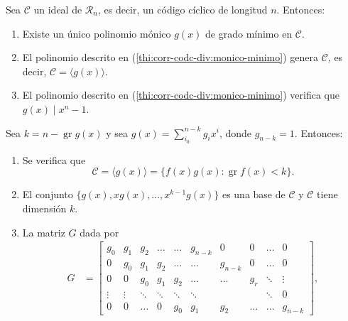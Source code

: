 \begin{theorem}
  \label{th:corr-cod-div}
  Sea \(\mathcal C\) un ideal de \(\mathcal R_n\), es decir, un código cíclico de longitud \(n\). Entonces:
  \begin{enumerate}
    \item Existe un único polinomio mónico \(g(x)\) de grado mínimo en \(\mathcal C\).\label{thi:corr-codc-div:monico-minimo}
    \item El polinomio descrito en (\ref{thi:corr-codc-div:monico-minimo}) genera \(\mathcal C\), es decir, \(\mathcal C = \langle g(x)\rangle\).
    \item El polinomio descrito en (\ref{thi:corr-codc-div:monico-minimo}) verifica que \(g(x) \mid x^n -1\).\label{thi:corr-codc-div:div-xn-1}
  \end{enumerate}
  Sea \(k = n - \operatorname{gr} g(x)\) y sea \(g(x) = \sum_{i_0}^{n-k}g_ix^{i}\), donde \(g_{n-k} = 1\). Entonces:
  \begin{enumerate}[resume]
    \item \label{thi:corr-codc-div:dim-ideal} Se verifica que \[
      \mathcal C = \langle g(x) \rangle = \{f(x)g(x) : \operatorname{gr} f(x) < k\}.
    \]
    \item El conjunto \(\{g(x), xg(x), \dots, x^{k-1}g(x)\}\) es una base de \(\mathcal C\) y \(\mathcal C\) tiene dimensión \(k\).
    \item La matriz \(G\) dada por \begin{align*}
      G &= \begin{bmatrix}
        g_0 & g_1 & g_2 & \dots & \dots & g_{n-k} & 0 & 0 & \dots & 0 \\
        0 & g_0 & g_1 & g_2 & \dots & \dots & g_{n-k} & 0 & \dots & 0 \\
        0 & 0 & g_0 & g_1 & g_2 & \dots & \dots & g_r & \ddots & \vdots \\
        \vdots & \vdots & \ddots & \ddots & \ddots & \ddots & & & \ddots & 0\\
        0 & 0 & \dots & 0 & g_0 & g_1 & g_2 & \dots & \dots & g_{n-k} 
      \end{bmatrix},

\end{align*}
\end{enumerate}
\end{theorem}
